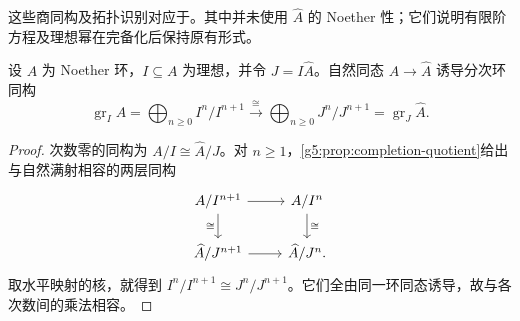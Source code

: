 这些商同构及拓扑识别对应于\cite[第8节，定理8.11、8.13，第61页]{Matsumura1989}。其中并未使用 \(\widehat A\) 的 Noether 性；它们说明有限阶方程及理想幂在完备化后保持原有形式。

\begin{proposition}\label{g5:prop:completion-associated-graded}
	设 \(A\) 为 Noether 环，\(I\subseteq A\) 为理想，并令 \(J=I\widehat A\)。自然同态 \(A\to\widehat A\) 诱导分次环同构
	\[
		\operatorname{gr}_I A
		=\bigoplus_{n\geq0}I^n/I^{n+1}
		\xrightarrow{\ \cong\ }
		\bigoplus_{n\geq0}J^n/J^{n+1}
		=\operatorname{gr}_J\widehat A.
	\]
\end{proposition}
\begin{proof}
	次数零的同构为 \(A/I\cong\widehat A/J\)。对 \(n\geq1\)，\cref{g5:prop:completion-quotient}给出与自然满射相容的两层同构
	\[
		\begin{tikzcd}
			A/I^{n+1} \arrow[r] \arrow[d,"\cong"'] & A/I^n \arrow[d,"\cong"] \\
			\widehat A/J^{n+1} \arrow[r] & \widehat A/J^n.
		\end{tikzcd}
	\]
	取水平映射的核，就得到 \(I^n/I^{n+1}\cong J^n/J^{n+1}\)。它们全由同一环同态诱导，故与各次数间的乘法相容。
\end{proof}

